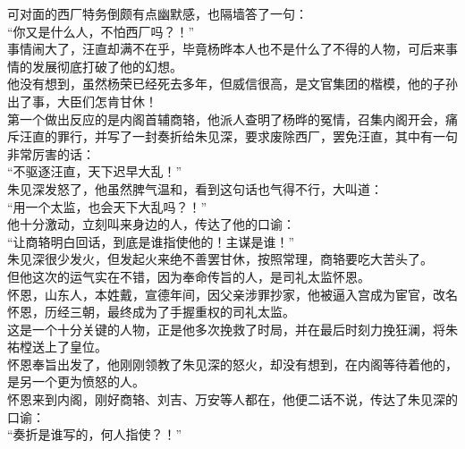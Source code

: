 \begin{multicols}{\theparacolNo}
可对面的西厂特务倒颇有点幽默感，也隔墙答了一句：\\

“你又是什么人，不怕西厂吗？！”\\

事情闹大了，汪直却满不在乎，毕竟杨晔本人也不是什么了不得的人物，可后来事情的发展彻底打破了他的幻想。\\

他没有想到，虽然杨荣已经死去多年，但威信很高，是文官集团的楷模，他的子孙出了事，大臣们怎肯甘休！\\

第一个做出反应的是内阁首辅商辂，他派人查明了杨晔的冤情，召集内阁开会，痛斥汪直的罪行，并写了一封奏折给朱见深，要求废除西厂，罢免汪直，其中有一句非常厉害的话：\\

“不驱逐汪直，天下迟早大乱！”\\

朱见深发怒了，他虽然脾气温和，看到这句话也气得不行，大叫道：\\

“用一个太监，也会天下大乱吗？！”\\

他十分激动，立刻叫来身边的人，传达了他的口谕：\\

“让商辂明白回话，到底是谁指使他的！主谋是谁！”\\

朱见深很少发火，但发起火来绝不善罢甘休，按照常理，商辂要吃大苦头了。\\

但他这次的运气实在不错，因为奉命传旨的人，是司礼太监怀恩。\\

怀恩，山东人，本姓戴，宣德年间，因父亲涉罪抄家，他被逼入宫成为宦官，改名怀恩，历经三朝，最终成为了手握重权的司礼太监。\\

这是一个十分关键的人物，正是他多次挽救了时局，并在最后时刻力挽狂澜，将朱祐樘送上了皇位。\\

怀恩奉旨出发了，他刚刚领教了朱见深的怒火，却没有想到，在内阁等待着他的，是另一个更为愤怒的人。\\

怀恩来到内阁，刚好商辂、刘吉、万安等人都在，他便二话不说，传达了朱见深的口谕：\\

“奏折是谁写的，何人指使？！”\\


\end{multicols}
